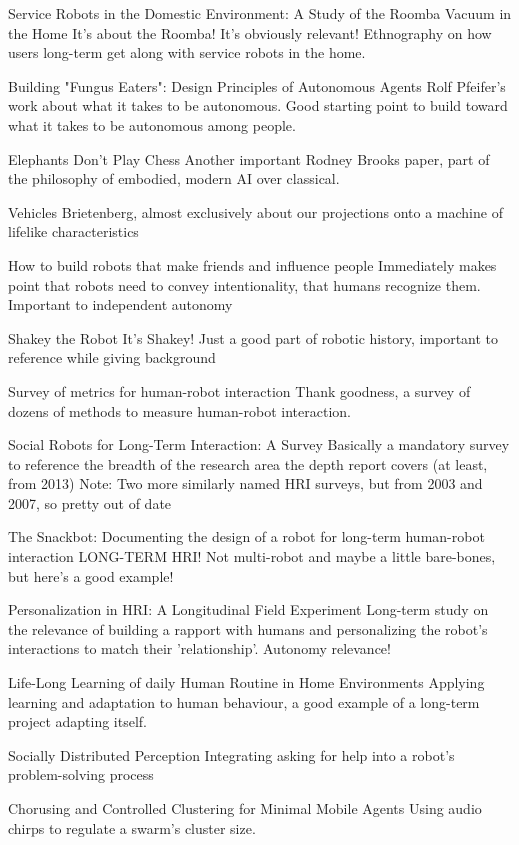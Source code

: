 \documentclass{sfuthesis}
\begin{document}
Service Robots in the Domestic Environment: A Study of the Roomba Vacuum in the Home	It's about the Roomba! It's obviously relevant! Ethnography on how users long-term get along with service robots in the home.	

Building "Fungus Eaters": Design Principles of Autonomous Agents	Rolf Pfeifer's work about what it takes to be autonomous. Good starting point to build toward what it takes to be autonomous among people.

Elephants Don't Play Chess	Another important Rodney Brooks paper, part of the philosophy of embodied, modern AI over classical.

Vehicles	Brietenberg, almost exclusively about our projections onto a machine of lifelike characteristics

How to build robots that make friends and influence people	Immediately makes point that robots need to convey intentionality, that humans recognize them. Important to independent autonomy

Shakey the Robot	It's Shakey! Just a good part of robotic history, important to reference while giving background

Survey of metrics for human-robot interaction	Thank goodness, a survey of dozens of methods to measure human-robot interaction.

Social Robots for Long-Term Interaction: A Survey Basically a mandatory survey to reference the breadth of the research area the depth report covers (at least, from 2013) Note: Two more similarly named HRI surveys, but from 2003 and 2007, so pretty out of date

The Snackbot: Documenting the design of a robot for long-term human-robot interaction	LONG-TERM HRI! Not multi-robot and maybe a little bare-bones, but here's a good example!

Personalization in HRI: A Longitudinal Field Experiment	Long-term study on the relevance of building a rapport with humans and personalizing the robot's interactions to match their 'relationship'. Autonomy relevance!

Life-Long Learning of daily Human Routine in Home Environments	Applying learning and adaptation to human behaviour, a good example of a long-term project adapting itself.

Socially Distributed Perception	Integrating asking for help into a robot's problem-solving process

Chorusing and Controlled Clustering for Minimal Mobile Agents	Using audio chirps to regulate a swarm's cluster size.	
\end{document}

